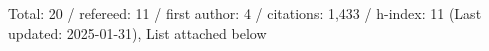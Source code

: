Total: 20 / refereed: 11 / first author: 4 / citations: 1,433 / h-index: 11 (Last updated: 2025-01-31), List attached below